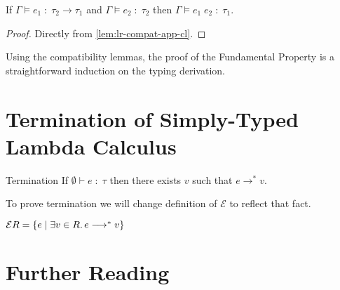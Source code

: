 \begin{lemma}
  If $\Gamma \models e_1 \;:\; \tau_2 \to \tau_1 $
  and $\Gamma \models e_2 \;:\; \tau_2$
  then $\Gamma \models e_1\;e_2 \;:\; \tau_1$.
\end{lemma}
\begin{proof}
  Directly from \autoref{lem:lr-compat-app-cl}.
\end{proof}

Using the compatibility lemmas, the proof of the Fundamental Property is
a straightforward induction on the typing derivation.

\section{Termination of Simply-Typed Lambda Calculus}

\begin{theorem}{Termination}
  If $\emptyset \vdash e \;:\; \tau$ then
  there exists $v$ such that $e \longrightarrow^* v$.
\end{theorem}

To prove termination we will change definition of $\mathcal{E}$ to reflect that fact.

$\mathcal{E}R = \{ e \mid \exists v \in R\ldotp e \longrightarrow^* v \}$

\section{Further Reading}
